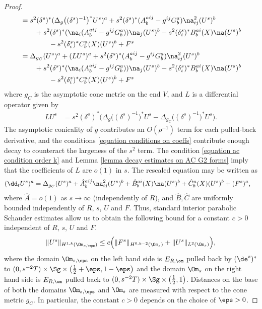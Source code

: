 \documentclass[hidelinks, 12pt, oneside, reqno]{amsart}
\begin{document}
\begin{proof}
\begin{align*}
    &= s^{2}(\delta^s)^* (\Delta_g \big((\delta^s)^{-1}\big)^*U^s)^a + s^{2}(\delta^s)^*(A^{aij}_b - g^{ij}G^a_b)\na^2_{ij} (U^s)^b \\ 
    &\qquad +  s^{2}(\delta^s)^*(\na_i(A^{aij}_b - g^{ij}G^a_b))\na_j (U^s)^b - s^2 (\delta_i^s)^* B^{ai}_b(X) \na (U^s)^b \\
    &\qquad \qquad - s^2 (\delta_i^s)^*C^a_b(X) (U^s)^b + F^s \\
    &= \Delta_{g_C} (U^s)^a + (LU^s)^a + s^{2}(\delta^s)^*(A^{aij}_b - g^{ij}G^a_b)\na^2_{ij} (U^s)^b \\ &\qquad +  s^{2}(\delta^s)^*(\na_i(A^{aij}_b - g^{ij}G^a_b))\na_j (U^s)^b  - s^2 (\delta_i^s)^* B^{ai}_b(X) \na (U^s)^b \\
    &\qquad \qquad - s^2 (\delta_i^s)^*C^a_b(X) (U^s)^b + F^s
    \end{align*}
    where $g_{C}$ is the asymptotic cone metric on the end $V$, and $L$ is a differential operator given by
    \begin{align*}
    L U^s &= s^{2}(\delta^s)^* \Big(\Delta_{g}\big((\delta^s)^{-1}\big)^*U^s - \Delta_{g_{C}}\big((\delta^s)^{-1}\big)^*U^s \Big).
    \end{align*}
    The asymptotic conicality of $g$ contributes an $O(\rho^{-1})$ term for each pulled-back derivative, and the conditions \eqref{equation conditions on coeffs} contribute enough decay to counteract the largeness of the $s^2$ term.  The condition \eqref{equation ac condition order k} and Lemma \ref{lemma decay estimates on AC G2 forms} imply that the coefficients of $L$ are $o(1)$ in $s$. The rescaled equation may be written as
    \begin{align}\label{equation rescaled parabolic system}
    (\dd_t U^s)^a
    &= \Delta_{g_C} (U^s)^a + \hat A^{aij}_b \na^2_{ij} (U^s)^b + \hat B^{ai}_b(X) \na (U^s)^b  + \hat C^a_b(X) (U^s)^b + (F^s)^a,
    \end{align}
    where $\hat A = o(1)$ as $s\rightarrow \infty$ (independently of $R$), and $\hat B, \hat C$ are uniformly bounded independently of $R$, $s$, $U$ and $F$. Thus, standard interior parabolic Schauder estimates allow us to obtain the following bound for a constant $c > 0$ independent of $R$, $s$, $U$ and $F$.
    \begin{equation}\label{equation interior schauder estimates}
       \|U^s\|_{H^{1,k}(\Om_{s,\eps})} \le c\Big(\|F^s\|_{H^{0,k-2}(\Om_s)} + \|U^s\|_{L^2(\Om_s)} \Big),
    \end{equation}
    where the domain $\Om_{s,\eps}$ on the left hand side is $E_{R,\om}$ pulled back by $(\de^s)^*$ to $(0,s^{-2}T) \times \Sg \times \big(\tfrac12 + \eps, 1 - \eps\big)$ and the domain $\Om_s$ on the right hand side is $E_{R,\om}$ pulled back to $(0,s^{-2}T) \times \Sg \times \big(\tfrac12, 1\big)$. Distances on the base of both the domains $\Om_{s,\eps}$ and $\Om_{s}$ are measured with respect to the cone metric $g_C$. In particular, the constant $c >0$ depends on the choice of $\eps > 0$.


\end{proof}
\end{document}
